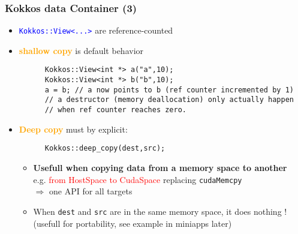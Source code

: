 \begin{frame}[fragile=singleslide]
  \frametitle{Kokkos data Container (3)}

  \begin{itemize}
  \item \textcolor{blue}{\texttt{Kokkos::View<...>}} are reference-counted
  \item \textcolor{orange}{\textbf{shallow copy}} is default behavior
    \begin{verbatim}
      Kokkos::View<int *> a("a",10);
      Kokkos::View<int *> b("b",10);
      a = b; // a now points to b (ref counter incremented by 1)
      // a destructor (memory deallocation) only actually happen
      // when ref counter reaches zero.
    \end{verbatim}
  \item \textcolor{orange}{\textbf{Deep copy}} must by explicit:
    \begin{verbatim}
      Kokkos::deep_copy(dest,src);
    \end{verbatim}
    \begin{itemize}
    \item \textbf{Usefull when copying data from a memory space to another}\\
      e.g. \textcolor{red}{from HostSpace to CudaSpace} replacing \texttt{cudaMemcpy}\\
      $\Rightarrow$ one API for all targets
    \item When \texttt{dest} and \texttt{src} are in the same memory space, it does nothing ! (usefull for portability, see example in miniapps later)
    \end{itemize}
  \end{itemize}

\end{frame}



